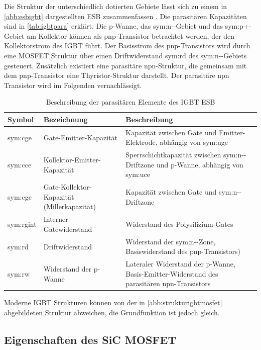 Die Struktur der unterschiedlich dotierten Gebiete lässt sich zu einem in \autoref{abb:esbigbt} dargestellten \gls{ESB} zusammenfassen \cite{Wintrichsemikron}. Die parasitären Kapazitäten sind in \autoref{tab:igbtpara} erklärt. Die p-Wanne, das \gls{sym:n-}-Gebiet und das \gls{sym:p+}-Gebiet am Kollektor können als pnp-Transistor betrachtet werden, der den Kollektorstrom des \gls{IGBT} führt. Der Basisstrom des pnp-Transistors wird durch eine \gls{MOSFET} Struktur über einen Driftwiderstand \gls{sym:rd} des \gls{sym:n-}-Gebiets gesteuert. Zusätzlich existiert eine parasitäre npn-Struktur, die gemeinsam mit dem pnp-Transistor eine Thyristor-Struktur darstellt. Der parasitäre npn Transistor wird im Folgenden vernachlässigt.
 
\begin{table}[htb]
	\centering
	\caption{Beschreibung der parasitären Elemente des \gls{IGBT} \gls{ESB}  \cite{Wintrichsemikron}}
	\label{tab:igbtpara}
	\begin{tabular}{|L{0.1\textwidth}|L{0.3\textwidth}|L{0.5\textwidth}|}
		\hline
		\textbf{Symbol} & \textbf{Bezeichnung} & \textbf{Beschreibung}\\
		\hline
		\gls{sym:cge} & Gate-Emitter-Kapazität & Kapazität zwischen Gate und Emitter-Elektrode, abhängig von \gls{sym:uge}  \\
		\hline
		\gls{sym:cce} & Kollektor-Emitter-
		Kapazität &Sperrschichtkapazität zwischen \gls{sym:n-}-Driftzone und p-Wanne, abhängig von \gls{sym:uce}\\
		\hline
		\gls{sym:cgc} & Gate-Kollektor-
		Kapazität (Millerkapazität) & Kapazität zwischen Gate und \gls{sym:n-}-Driftzone\\
		\hline
		\gls{sym:rgint} & Interner Gatewiderstand & Widerstand des Polysilizium-Gates \\
		\hline
		\gls{sym:rd} & Driftwiderstand & Widerstand der \gls{sym:n-}-Zone, Basiswiderstand des  pnp-Transistors) \\
		\hline
		\gls{sym:rw} & Widerstand
		der p-Wanne & Lateraler Widerstand der p-Wanne, Basis-Emitter-Widerstand des parasitären npn-Transistors \\
		\hline
	\end{tabular}
\end{table}

Moderne \gls{IGBT} Strukturen können von der in \autoref{abb:strukturigbtmosfet} abgebildeten Struktur abweichen, die Grundfunktion ist jedoch gleich.


\subsection{Eigenschaften des SiC MOSFET}

